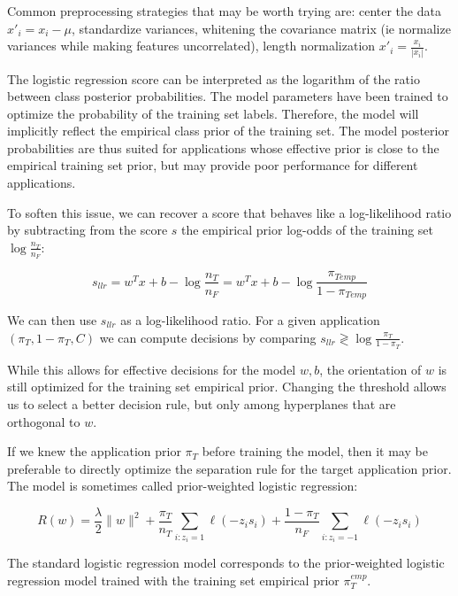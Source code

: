 Common preprocessing strategies that may be worth trying are: center the data $x'_i = x_i - \mu$, standardize variances, whitening the covariance matrix (ie normalize variances while making features uncorrelated), length normalization $x'_i = \frac{x_i}{|x_i|}$.

The logistic regression score can be interpreted as the logarithm of the ratio between class posterior probabilities. The model parameters have been trained to optimize the probability of the training set labels. Therefore, the model will implicitly reflect the empirical class prior of the training set. The model posterior probabilities are thus suited for applications whose effective prior is close to the empirical training set prior, but may provide poor performance for different applications.

To soften this issue, we can recover a score that behaves like a log-likelihood ratio by subtracting from the score $s$ the empirical prior log-odds of the training set $\log \frac{n_T}{n_F}$:


\begin{equation*}
s_{llr} = w^T x + b - \log \frac{n_T}{n_F} = w^T x + b - \log \frac{\pi_{Temp}}{1-\pi_{Temp}}
\end{equation*}

We can then use $s_{llr}$ as a log-likelihood ratio. For a given application $(\pi_T, 1-\pi_T, C)$ we can compute decisions by comparing $s_{llr} \gtrless \log \frac{\pi_T}{1 - \pi_T}$.

While this allows for effective decisions for the model $w, b$, the orientation of $w$ is still optimized for the training set empirical prior. Changing the threshold allows us to select a better decision rule, but only among hyperplanes that are orthogonal to $w$.

If we knew the application prior $\pi_T$ before training the model, then it may be preferable to directly optimize the separation rule for the target application prior. The model is sometimes called prior-weighted logistic regression:


\begin{equation*}
R(w) = \frac{\lambda}{2} \|w\|^2 + \frac{\pi_T}{n_T} \sum_{i:z_i=1} \ell(-z_i s_i) + \frac{1-\pi_T}{n_F} \sum_{i:z_i=-1} \ell(-z_i s_i)
\end{equation*}

The standard logistic regression model corresponds to the prior-weighted logistic regression model trained with the training set empirical prior $\pi_T^{emp}$.

